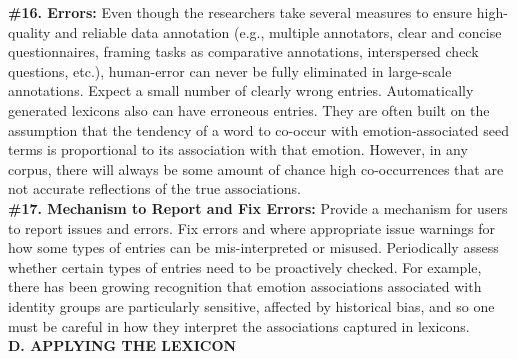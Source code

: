 \documentclass[11pt]{article}
\begin{document}
\noindent \textbf{\#16. Errors:}
Even though the researchers take several measures to ensure high-quality and reliable data annotation (e.g.,
multiple annotators, clear and concise questionnaires, framing tasks as comparative annotations,
interspersed check questions, etc.), human-error can never be fully eliminated in large-scale annotations.
Expect a small number of clearly wrong entries.
Automatically generated lexicons also can have erroneous entries. They are often built on the assumption that the tendency of a word to co-occur with emotion-associated seed terms is proportional to its association with that emotion. However, in any corpus, there will always be some amount of chance high co-occurrences that are not accurate reflections of the true associations.\\[-10pt]


\noindent \textbf{\#17. Mechanism to Report and Fix Errors:} Provide a mechanism for users to report issues and errors. Fix errors and where appropriate issue warnings for how some types of entries can be mis-interpreted or misused. Periodically assess whether certain types of entries need to be proactively checked. For example, there has been growing recognition that emotion associations associated with identity groups are particularly sensitive, affected by historical bias, and so one must be careful in how they interpret the associations captured in lexicons.\\

\noindent \textbf{D. APPLYING THE LEXICON}\\[-8pt]

\end{document}
